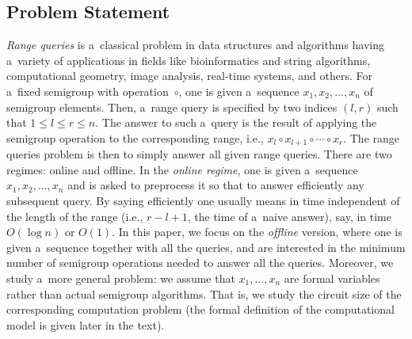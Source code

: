 \documentclass[11pt,letterpaper]{article}
\begin{document}
\subsection{Problem Statement}
{\em Range queries} is a~classical problem in data structures and algorithms having a~variety of applications in fields like bioinformatics and string algorithms, computational geometry, image analysis, real-time systems, and others. For a~fixed semigroup with operation~$\circ$, one is given a~sequence $x_1, x_2, \dotsc, x_n$ of semigroup elements. Then, a~range query is specified by two indices $(l,r)$ such that $1 \le l \le r \le n$. The answer to such a~query is the result of applying the semigroup operation to the corresponding range, i.e., $x_l \circ x_{l+1} \circ \dotsb \circ x_r$. The range queries problem is then to simply answer all given range queries. There are two regimes: online and offline. In the {\em online regime}, one is given a~sequence $x_1, x_2, \dotsc, x_n$ and is asked to preprocess it so that to answer efficiently any subsequent query. By saying efficiently one usually means in time independent of the length of the range (i.e., $r-l+1$, the time of a~naive answer), say, in time $O(\log n)$ or $O(1)$. In this paper, we focus on the {\em offline} version, where one is given a~sequence together with all the queries, and are interested in the minimum number of semigroup operations needed to answer all the queries. Moreover, we study a~more general problem: we assume that $x_1, \dotsc, x_n$ are formal variables rather than actual semigroup algorithms. That is, we study the circuit size of the corresponding computation problem (the formal definition of the computational model is given later in the text).


\end{document}
